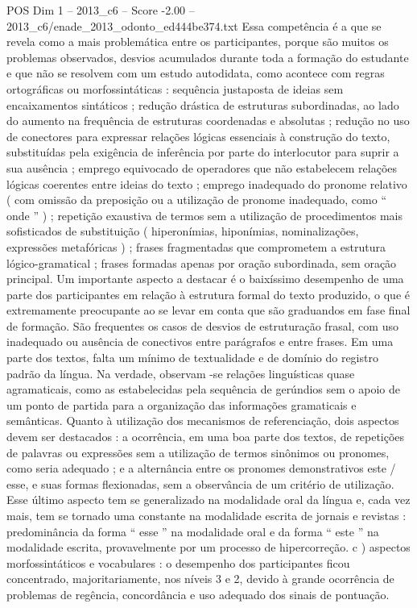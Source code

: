 \begin{textsample}{POS Dim 1 – 2013\_c6 – Score -2.00 – 2013\_c6/enade\_2013\_odonto\_ed444be374.txt}
Essa competência é a que se revela como a mais problemática entre os participantes, porque são muitos os problemas observados, desvios acumulados durante toda a formação do estudante e que não se resolvem com um estudo autodidata, como acontece com regras ortográficas ou morfossintáticas : sequência justaposta de ideias sem encaixamentos sintáticos ; redução drástica de estruturas subordinadas, ao lado do aumento na frequência de estruturas coordenadas e absolutas ; redução no uso de conectores para expressar relações lógicas essenciais à construção do texto, substituídas pela exigência de inferência por parte do interlocutor para suprir a sua ausência ; emprego equivocado de operadores que não estabelecem relações lógicas coerentes entre ideias do texto ; emprego inadequado do pronome relativo ( com omissão da preposição ou a utilização de pronome inadequado, como “ onde ” ) ; repetição exaustiva de termos sem a utilização de procedimentos mais sofisticados de substituição ( hiperonímias, hiponímias, nominalizações, expressões metafóricas ) ; frases fragmentadas que comprometem a estrutura lógico-gramatical ; frases formadas apenas por oração subordinada, sem oração principal.
Um importante aspecto a destacar é o baixíssimo desempenho de uma parte dos participantes em relação à estrutura formal do texto produzido, o que é extremamente preocupante ao se levar em conta que são graduandos em fase final de formação.
São frequentes os casos de desvios de estruturação frasal, com uso inadequado ou ausência de conectivos entre parágrafos e entre frases.
Em uma parte dos textos, falta um mínimo de textualidade e de domínio do registro padrão da língua.
Na verdade, observam -se relações linguísticas quase agramaticais, como as estabelecidas pela sequência de gerúndios sem o apoio de um ponto de partida para a organização das informações gramaticais e semânticas.
Quanto à utilização dos mecanismos de referenciação, dois aspectos devem ser destacados : a ocorrência, em uma boa parte dos textos, de repetições de palavras ou expressões sem a utilização de termos sinônimos ou pronomes, como seria adequado ; e a alternância entre os pronomes demonstrativos este / esse, e suas formas flexionadas, sem a observância de um critério de utilização.
Esse último aspecto tem se generalizado na modalidade oral da língua e, cada vez mais, tem se tornado uma constante na modalidade escrita de jornais e revistas : predominância da forma “ esse ” na modalidade oral e da forma “ este ” na modalidade escrita, provavelmente por um processo de hipercorreção. c ) aspectos morfossintáticos e vocabulares : o desempenho dos participantes ficou concentrado, majoritariamente, nos níveis 3 e 2, devido à grande ocorrência de problemas de regência, concordância e uso adequado dos sinais de pontuação.

\end{textsample}
